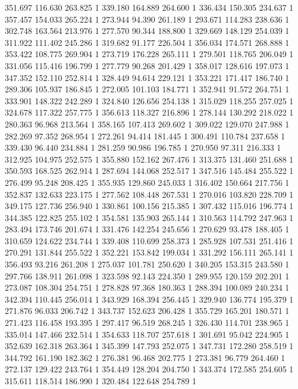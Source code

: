	351.697	116.630	263.825	1
	339.180	164.889	264.600	1
	336.434	150.305	234.637	1
	357.457	154.033	265.224	1
	273.944	94.390	261.189	1
	293.671	114.283	238.636	1
	302.748	163.564	213.976	1
	277.570	90.344	188.800	1
	329.669	148.129	254.039	1
	311.922	111.402	245.286	1
	319.682	91.177	226.504	1
	356.034	174.571	268.888	1
	353.422	108.775	269.904	1
	273.719	176.228	265.111	1
	279.501	118.765	206.049	1
	331.056	115.416	196.799	1
	277.779	90.268	201.429	1
	358.017	128.616	197.073	1
	347.352	152.110	252.814	1
	328.449	94.614	229.121	1
	353.221	171.417	186.740	1
	289.306	105.937	186.845	1
	272.005	101.103	184.771	1
	352.941	91.572	264.751	1
	333.901	148.322	242.289	1
	324.840	126.656	254.138	1
	315.029	118.255	257.025	1
	324.678	117.322	257.775	1
	356.613	118.327	216.896	1
	278.144	130.292	218.022	1
	280.363	96.968	213.564	1
	358.165	107.413	269.602	1
	309.022	129.070	247.988	1
	282.269	97.352	268.954	1
	272.261	94.414	181.445	1
	300.491	110.784	237.658	1
	339.430	96.440	234.884	1
	281.259	90.986	196.785	1
	270.950	97.311	216.333	1
	312.925	104.975	252.575	1
	355.880	152.162	267.476	1
	313.375	131.460	251.688	1
	350.593	168.525	262.914	1
	287.694	144.068	252.517	1
	347.516	145.484	255.522	1
	276.499	95.248	208.425	1
	355.935	129.860	245.033	1
	316.402	150.664	217.756	1
	352.837	132.633	223.175	1
	277.562	108.448	267.531	1
	270.016	103.820	228.709	1
	349.175	127.736	256.940	1
	330.861	100.156	215.385	1
	307.432	115.016	196.774	1
	344.385	122.825	255.102	1
	354.581	135.903	265.144	1
	310.563	114.792	247.963	1
	283.494	173.746	201.674	1
	331.476	142.254	245.656	1
	270.629	93.478	188.405	1
	310.659	124.622	234.744	1
	339.408	110.699	258.373	1
	285.928	107.531	251.416	1
	270.291	131.844	255.522	1
	352.221	153.842	199.034	1
	331.292	156.111	265.141	1
	356.493	93.216	261.208	1
	275.037	101.781	250.620	1
	340.205	153.315	243.580	1
	297.766	138.911	261.098	1
	323.598	92.143	224.350	1
	289.955	120.159	202.201	1
	273.087	108.304	254.751	1
	278.828	97.368	180.363	1
	288.394	100.089	240.234	1
	342.394	110.445	256.014	1
	343.929	168.394	256.445	1
	329.940	136.774	195.379	1
	271.876	96.033	206.742	1
	343.737	152.623	206.428	1
	355.729	165.201	180.571	1
	271.423	116.458	193.395	1
	297.417	96.519	268.245	1
	326.430	114.701	238.965	1
	335.014	147.466	232.514	1
	354.633	118.707	257.618	1
	301.691	95.042	224.905	1
	352.639	162.318	263.364	1
	345.399	147.793	252.075	1
	347.731	172.280	258.519	1
	344.792	161.190	182.362	1
	276.381	96.468	202.775	1
	273.381	96.779	264.460	1
	272.137	129.422	243.764	1
	354.449	128.204	204.750	1
	343.374	172.585	254.605	1
	315.611	118.514	186.990	1
	320.484	122.648	254.789	1
